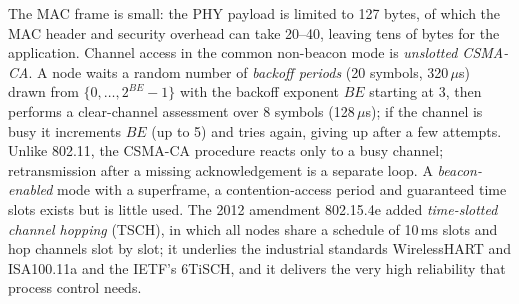 The MAC frame is small: the PHY payload is limited to 127 bytes, of which the MAC header and security
overhead can take 20--40, leaving tens of bytes for the application. Channel access in the common
non-beacon mode is \emph{unslotted CSMA-CA}. A node waits a random number of \emph{backoff periods}
(20 symbols, 320\,$\mu$s) drawn from $\{0,\dots,2^{BE}-1\}$ with the backoff exponent $BE$ starting at
3, then performs a clear-channel assessment over 8 symbols (128\,$\mu$s); if the channel is busy it
increments $BE$ (up to 5) and tries again, giving up after a few attempts. Unlike 802.11, the CSMA-CA
procedure reacts only to a busy channel; retransmission after a missing acknowledgement is a separate
loop. A \emph{beacon-enabled} mode with a superframe, a contention-access period and guaranteed time
slots exists but is little used. The 2012 amendment 802.15.4e added \emph{time-slotted channel
hopping} (TSCH), in which all nodes share a schedule of 10\,ms slots and hop channels slot by slot; it
underlies the industrial standards WirelessHART and ISA100.11a and the IETF's 6TiSCH, and it delivers
the very high reliability that process control needs.

